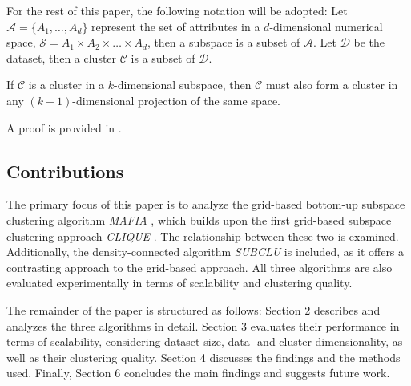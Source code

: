 For the rest of this paper, the following notation will be adopted: Let $\mathcal{A} = \{A_1, \dots, A_d\}$ represent the set of attributes in a $d$-dimensional numerical space, $\mathcal{S} = A_1 \times A_2 \times \dots \times A_d$, then a subspace is a subset of $\mathcal{A}$. Let $\mathcal{D}$ be the dataset, then a cluster $\mathcal{C}$ is a subset of $\mathcal{D}$.

\begin{lemma}\label{lem:mono}
    If $\mathcal{C}$ is a cluster in a $k$-dimensional subspace, then $\mathcal{C}$ must also form a cluster in any $(k-1)$-dimensional projection of the same space.
\end{lemma}
A proof is provided in \cite{clique}.

\subsection{Contributions}
The primary focus of this paper is to analyze the grid-based bottom-up subspace clustering algorithm \textit{MAFIA} \cite{mafia}, which builds upon the first grid-based subspace clustering approach \textit{CLIQUE} \cite{clique}. The relationship between these two is examined. Additionally, the density-connected algorithm \textit{SUBCLU} \cite{subclu} is included, as it offers a contrasting approach to the grid-based approach. All three algorithms are also evaluated experimentally in terms of scalability and clustering quality.

The remainder of the paper is structured as follows: Section 2 describes and analyzes the three algorithms in detail. Section 3 evaluates their performance in terms of scalability, considering dataset size, data- and cluster-dimensionality, as well as their clustering quality. Section 4 discusses the findings and the methods used. Finally, Section 6 concludes the main findings and suggests future work.